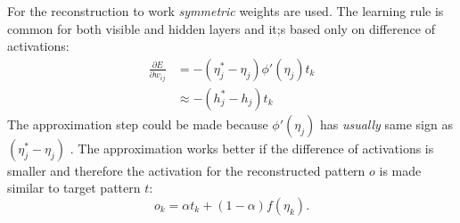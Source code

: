 For the reconstruction to work \emph{symmetric} weights are used. The learning rule is common for both visible and hidden layers and it;s based only on difference of activations: 
\begin{align}
\frac{\partial E}{\partial w_{ij}} &= -(\eta^{*}_j - \eta_j) \phi'(\eta_j) t_k \\
&\approx -(h^{*}_j - h_j)t_k
\end{align} 
The approximation step could be made because $\phi'(\eta_j)$ has \emph{usually} same sign as $(\eta^{*}_j - \eta_j) $ \citep{hinton1988learning, o1996bio}. The approximation works better if the difference of activations is smaller and therefore the activation for the reconstructed pattern $o$  is made similar to target pattern $t$: 
\begin{equation}
o_k = \alpha t_k + (1-\alpha)f(\eta_k). 
\end{equation} 




